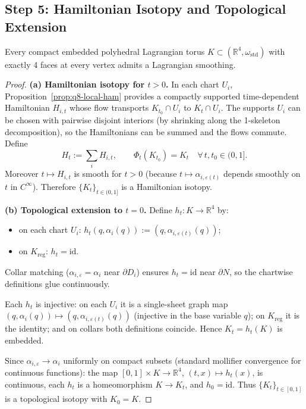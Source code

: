\subsection*{Step 5: Hamiltonian Isotopy and Topological Extension}

\begin{theorem}\label{thm:q8-main}
Every compact embedded polyhedral Lagrangian torus $K\subset(\mathbb R^4,\omega_{\mathrm{std}})$
with exactly 4 faces at every vertex admits a Lagrangian smoothing.
\end{theorem}

\begin{proof}
\textbf{(a) Hamiltonian isotopy for $t>0$.}
In each chart $U_i$, Proposition~\ref{prop:q8-local-ham} provides a compactly supported
time-dependent Hamiltonian $H_{i,t}$ whose flow transports $K_{t_0}\cap U_i$ to
$K_t\cap U_i$.  The supports $U_i$ can be chosen with pairwise disjoint interiors
(by shrinking along the 1-skeleton decomposition), so the Hamiltonians can be summed
and the flows commute.  Define
\[
H_t := \sum_i H_{i,t},\qquad
\Phi_t(K_{t_0})=K_t\quad\forall\,t,t_0\in(0,1].
\]
Moreover $t\mapsto H_{i,t}$ is smooth for $t>0$
(because $t\mapsto\alpha_{i,\varepsilon(t)}$ depends smoothly on $t$ in $C^\infty$).
Therefore $\{K_t\}_{t\in(0,1]}$ is a Hamiltonian isotopy.

\textbf{(b) Topological extension to $t=0$.}
Define $h_t\colon K\to\mathbb R^4$ by:
\begin{itemize}
\item on each chart $U_i$: $h_t(q,\alpha_i(q)):=(q,\alpha_{i,\varepsilon(t)}(q))$;
\item on $K_{\mathrm{reg}}$: $h_t=\mathrm{id}$.
\end{itemize}
Collar matching ($\alpha_{i,\varepsilon}=\alpha_i$ near $\partial D_i$) ensures
$h_t=\mathrm{id}$ near $\partial N$, so the chartwise definitions glue continuously.

Each $h_t$ is injective: on each $U_i$ it is a single-sheet graph map
$(q,\alpha_i(q))\mapsto(q,\alpha_{i,\varepsilon(t)}(q))$
(injective in the base variable $q$); on $K_{\mathrm{reg}}$ it is the identity;
and on collars both definitions coincide.  Hence $K_t=h_t(K)$ is embedded.

Since $\alpha_{i,\varepsilon}\to\alpha_i$ uniformly on compact subsets
(standard mollifier convergence for continuous functions):
the map $[0,1]\times K\to\mathbb R^4$, $(t,x)\mapsto h_t(x)$, is continuous,
each $h_t$ is a homeomorphism $K\to K_t$, and $h_0=\mathrm{id}$.
Thus $\{K_t\}_{t\in[0,1]}$ is a topological isotopy with $K_0=K$.
\end{proof}


